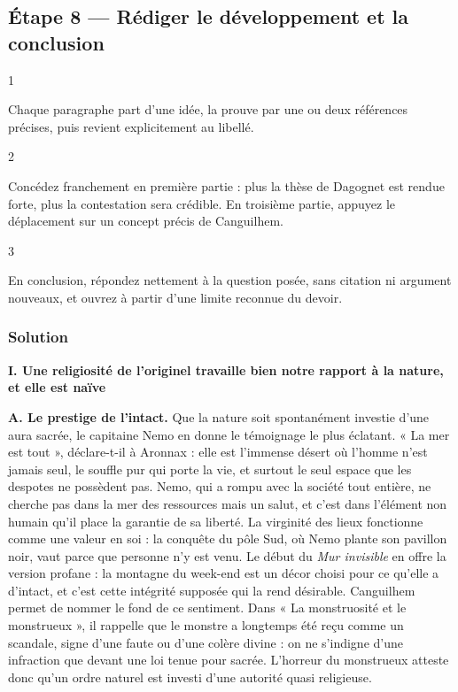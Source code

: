 \documentclass[11pt,a4paper]{article}
\begin{document}
\hypertarget{uxe9tape-8-ruxe9diger-le-duxe9veloppement-et-la-conclusion}{%
\subsection{Étape 8 --- Rédiger le développement et la conclusion}\label{uxe9tape-8-ruxe9diger-le-duxe9veloppement-et-la-conclusion}}

\begin{indication}{1}

Chaque paragraphe part d'une idée, la prouve par une ou deux références précises, puis revient explicitement au libellé.

\end{indication}

\begin{indication}{2}

Concédez franchement en première partie : plus la thèse de Dagognet est rendue forte, plus la contestation sera crédible. En troisième partie, appuyez le déplacement sur un concept précis de Canguilhem.

\end{indication}

\begin{indication}{3}

En conclusion, répondez nettement à la question posée, sans citation ni argument nouveaux, et ouvrez à partir d'une limite reconnue du devoir.

\end{indication}

\hypertarget{solution-7}{%
\subsubsection{Solution}\label{solution-7}}

\textbf{I. Une religiosité de l'originel travaille bien notre rapport à la nature, et elle est naïve}

\textbf{A. Le prestige de l'intact.} Que la nature soit spontanément investie d'une aura sacrée, le capitaine Nemo en donne le témoignage le plus éclatant. « La mer est tout », déclare-t-il à Aronnax : elle est l'immense désert où l'homme n'est jamais seul, le souffle pur qui porte la vie, et surtout le seul espace que les despotes ne possèdent pas. Nemo, qui a rompu avec la société tout entière, ne cherche pas dans la mer des ressources mais un salut, et c'est dans l'élément non humain qu'il place la garantie de sa liberté. La virginité des lieux fonctionne comme une valeur en soi : la conquête du pôle Sud, où Nemo plante son pavillon noir, vaut parce que personne n'y est venu. Le début du \emph{Mur invisible} en offre la version profane : la montagne du week-end est un décor choisi pour ce qu'elle a d'intact, et c'est cette intégrité supposée qui la rend désirable. Canguilhem permet de nommer le fond de ce sentiment. Dans « La monstruosité et le monstrueux », il rappelle que le monstre a longtemps été reçu comme un scandale, signe d'une faute ou d'une colère divine : on ne s'indigne d'une infraction que devant une loi tenue pour sacrée. L'horreur du monstrueux atteste donc qu'un ordre naturel est investi d'une autorité quasi religieuse.
\end{document}
